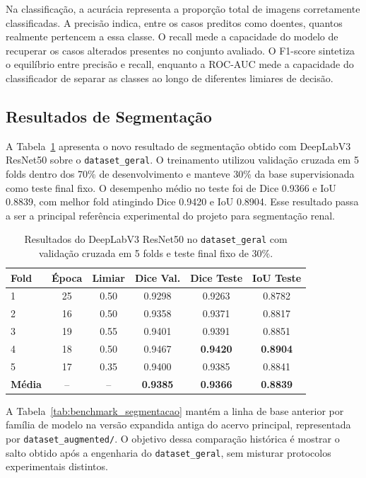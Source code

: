 \documentclass[12pt]{article}
\begin{document}
Na classificação, a acurácia representa a proporção total de imagens corretamente classificadas. A precisão indica, entre os casos preditos como doentes, quantos realmente pertencem a essa classe. O recall mede a capacidade do modelo de recuperar os casos alterados presentes no conjunto avaliado. O F1-score sintetiza o equilíbrio entre precisão e recall, enquanto a ROC-AUC mede a capacidade do classificador de separar as classes ao longo de diferentes limiares de decisão.

\subsection{Resultados de Segmentação}

A Tabela~\ref{tab:deeplab_dataset_geral_cv} apresenta o novo resultado de segmentação obtido com DeepLabV3 ResNet50 sobre o \texttt{dataset\_geral}. O treinamento utilizou validação cruzada em 5 folds dentro dos 70\% de desenvolvimento e manteve 30\% da base supervisionada como teste final fixo. O desempenho médio no teste foi de Dice 0.9366 e IoU 0.8839, com melhor fold atingindo Dice 0.9420 e IoU 0.8904. Esse resultado passa a ser a principal referência experimental do projeto para segmentação renal.

\begin{table}[H]
\centering
\caption{Resultados do DeepLabV3 ResNet50 no \texttt{dataset\_geral} com validação cruzada em 5 folds e teste final fixo de 30\%.}
\label{tab:deeplab_dataset_geral_cv}
\begin{tabular}{lccccc}
\hline
\textbf{Fold} & \textbf{Época} & \textbf{Limiar} & \textbf{Dice Val.} & \textbf{Dice Teste} & \textbf{IoU Teste} \\
\hline
1 & 25 & 0.50 & 0.9298 & 0.9263 & 0.8782 \\
2 & 16 & 0.50 & 0.9358 & 0.9371 & 0.8817 \\
3 & 19 & 0.55 & 0.9401 & 0.9391 & 0.8851 \\
4 & 18 & 0.50 & 0.9467 & \textbf{0.9420} & \textbf{0.8904} \\
5 & 17 & 0.35 & 0.9400 & 0.9385 & 0.8841 \\
\hline
\textbf{Média} & -- & -- & \textbf{0.9385} & \textbf{0.9366} & \textbf{0.8839} \\
\hline
\end{tabular}
\end{table}

A Tabela~\ref{tab:benchmark_segmentacao} mantém a linha de base anterior por família de modelo na versão expandida antiga do acervo principal, representada por \texttt{dataset\_augmented/}. O objetivo dessa comparação histórica é mostrar o salto obtido após a engenharia do \texttt{dataset\_geral}, sem misturar protocolos experimentais distintos.
\end{document}
